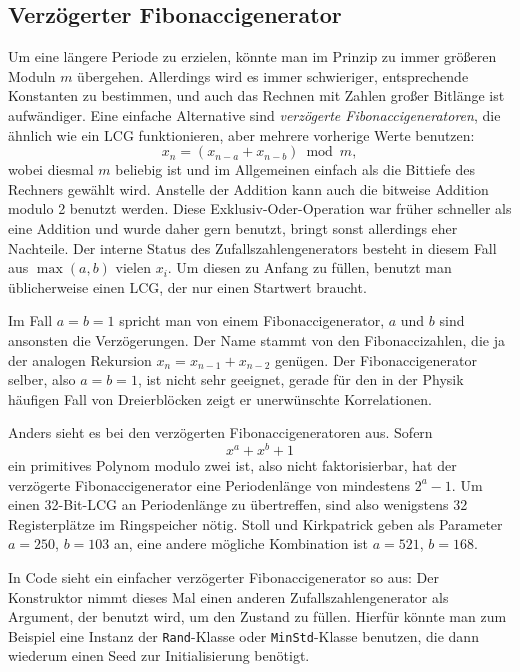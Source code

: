 \subsection{Verzögerter Fibonaccigenerator}

Um eine längere Periode zu erzielen, könnte man im Prinzip zu immer
größeren Moduln $m$ übergehen. Allerdings wird es immer schwieriger,
entsprechende Konstanten zu bestimmen, und auch das Rechnen mit
Zahlen großer Bitlänge ist aufwändiger. Eine einfache Alternative
sind \emph{verzögerte Fibonaccigeneratoren}, die ähnlich wie ein LCG
funktionieren, aber mehrere vorherige Werte benutzen:
\begin{equation}
  x_n = (x_{n-a} + x_{n-b}) \bmod m,
\end{equation}
wobei diesmal $m$ beliebig ist und im Allgemeinen einfach als die
Bittiefe des Rechners gewählt wird. Anstelle der Addition kann auch
die bitweise Addition modulo 2 benutzt werden.  Diese
Exklusiv-Oder-Operation war früher schneller als eine Addition und
wurde daher gern benutzt, bringt sonst allerdings eher Nachteile.  Der
interne Status des Zufallszahlengenerators besteht in diesem Fall aus
$\max(a,b)$ vielen $x_i$.  Um diesen zu Anfang zu füllen, benutzt man
üblicherweise einen LCG, der nur einen Startwert braucht.

Im Fall $a=b=1$ spricht man von einem Fibonaccigenerator, $a$ und $b$
sind ansonsten die Verzögerungen. Der Name stammt von den
Fibonaccizahlen, die ja der analogen Rekursion $x_n = x_{n-1} +
x_{n-2}$ genügen. Der Fibonaccigenerator selber, also $a=b=1$, ist
nicht sehr geeignet, gerade für den in der Physik häufigen Fall von
Dreierblöcken zeigt er unerwünschte Korrelationen.

Anders sieht es bei den verzögerten Fibonaccigeneratoren aus. Sofern
\begin{equation}
  x^a + x^b + 1
\end{equation}
ein primitives Polynom modulo zwei ist, also nicht faktorisierbar, hat
der verzögerte Fibonaccigenerator eine Periodenlänge von mindestens
$2^a-1$. Um einen 32-Bit-LCG an Periodenlänge zu übertreffen,
sind also wenigstens 32 Registerplätze im Ringspeicher nötig. Stoll
und Kirkpatrick geben als Parameter $a=250$, $b=103$ an, eine andere
mögliche Kombination ist $a=521$, $b=168$.

In Code sieht ein einfacher verzögerter Fibonaccigenerator so aus:
%
Der Konstruktor nimmt dieses Mal einen anderen Zufallszahlengenerator
als Argument, der benutzt wird, um den Zustand zu füllen. Hierfür
könnte man zum Beispiel eine Instanz der \lstinline!Rand!-Klasse oder
\lstinline!MinStd!-Klasse benutzen, die dann wiederum einen Seed zur
Initialisierung benötigt.

